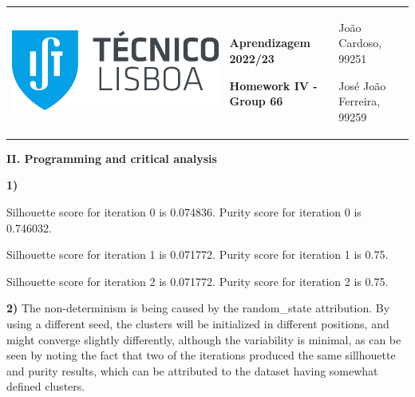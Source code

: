 \documentclass[11pt,a4paper]{article}
\begin{document}
\pagebreak
\color{darkgray}
\hspace{-8.25mm}
\renewcommand\tabularxcolumn[1]{m{#1}}
\begin{tabularx}{1.09\textwidth} {>{\raggedright\arraybackslash}X >{\centering\arraybackslash}X >{\raggedleft\arraybackslash}X}
  \includegraphics[scale=0.2]{tecnico.pdf}                           &
  \textbf{Aprendizagem 2022/23} \par \textbf{Homework IV - Group 66} &
  João Cardoso, 99251 \par José João Ferreira, 99259
\end{tabularx}
\renewcommand\tabularxcolumn[1]{p{#1}}
\color{black}

\begin{center}
  \textbf{II. Programming and critical analysis}
\end{center}

\begin{flushleft}
  \textbf{1)} \par
  Silhouette score for iteration 0 is 0.074836. \hspace{5mm} Purity score for iteration 0 is 0.746032. \par
  Silhouette score for iteration 1 is 0.071772. \hspace{5mm} Purity score for iteration 1 is 0.75. \par
  Silhouette score for iteration 2 is 0.071772. \hspace{5mm} Purity score for iteration 2 is 0.75. \par
\end{flushleft}

\begin{flushleft}
  \textbf{2)}
  The non-determinism is being caused by the random\_state attribution.
  By using a different seed, the clusters will be initialized in different positions, and might converge slightly differently, although the variability is minimal, as can be seen by noting the fact that two of the iterations produced the same sillhouette and purity results, which can be attributed to the dataset having somewhat defined clusters.
\end{flushleft}
\end{document}
